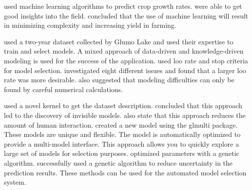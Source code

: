 \cite*{ref_paper_m3} used machine learning algorithms to predict crop growth rates. {\responsemod \citeauthor{ref_paper_m3} were able to get good insights into the field.} \citeauthor{ref_paper_m3} concluded that the use of machine learning will result in minimizing complexity and increasing yield in farming.

\cite*{01_rp} used a two-year dataset collected by Glumo Lake and used their expertise to train and select models. A mixed approach of data-driven and knowledge-driven modeling is used for the success of the application. \cite*{13_rp} used loo rate and stop criteria for model selection. \citeauthor{13_rp} investigated eight different issues and found that a larger loo rate was more desirable. \citeauthor{13_rp} also suggested that modeling difficulties can only be found by careful numerical calculations.

\cite*{17_rp} used a novel kernel to get the dataset description. \citeauthor{17_rp} concluded that this approach led to the discovery of invisible models. \citeauthor{17_rp} also state that this approach reduces the amount of human interaction. \cite*{04_rp} created a new model using the glmulti package. These models are unique and flexible. The model is automatically optimized to provide a multi-model interface. This approach allows you to quickly explore a large set of models for selection purposes. \cite*{08_rp} optimized parameters with a genetic algorithm. \citeauthor{08_rp} successfully used a genetic algorithm to reduce uncertainty in the prediction results. These methods can be used for the automated model selection system.
